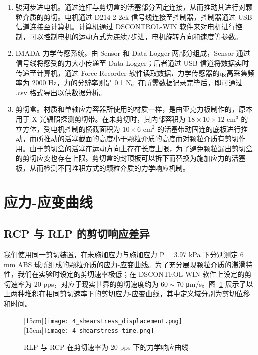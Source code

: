 \begin{enumerate}
    \item 骏河步进电机。通过连杆与剪切盒的活塞部分固定连接，从而推动其进行对颗粒介质的剪切。电机通过 D214-2-2ek 信号线连接至控制器，控制器通过 USB 信道连接至计算机。计算机通过 DSCONTROL-WIN 软件来对电机进行控制，可以控制电机的运动方式为连续/步进，电机旋转方向和速度等参数。
    \item IMADA 力学传感系统。由 Sensor 和 Data Logger 两部分组成，Sensor 通过信号线将感受的力大小传递至 Data Logger；后者通过 USB 信道将数据实时传递至计算机，通过 Force Recorder 软件读取数据，力学传感器的最高采集频率为 2000 \unit{\hertz}，力的分辨率则是 0.1 \unit{\newton}。在所需数据记录完毕后，即可通过 .csv 格式导出以供数据分析。
    \item 剪切盒。材质和单轴应力容器所使用的材质一样，是由亚克力板制作的，原本用于 X 光辐照探测剪切带。在未剪切时，其内部容积为 $18\times 10\times 12$ $\unit{\centi\meter}^{3}$ 的立方体，受电机控制的横截面积为 $10\times 6$ $\unit{\centi\meter}^{2}$ 的活塞带动固连的底板进行推动，而所推动的活塞截面的高度小于颗粒介质的高度而对颗粒介质有剪切作用。由于剪切盒的活塞在运动方向上存在长度上限，为了避免颗粒漏出剪切盒的剪切应变也存在上限。剪切盒的封顶板可以拆下而替换为施加应力的活塞板，从而检测不同堆积方式的颗粒介质的力学响应机制。
\end{enumerate}

\section{应力-应变曲线}

\subsection{RCP 与 RLP 的剪切响应差异}

我们使用同一剪切装置，在未施加应力与施加应力 P = 3.97 \unit{\kilo\pascal} 下分别测定 6 \unit{\milli\meter} ABS 球所组成的颗粒介质的应力-应变曲线。为了充分展现颗粒介质的滞滑特性，我们在实验时设定的剪切速率极低；在 DSCONTROL-WIN 软件上设定的剪切速率为 20 \unit{pps}，对应于现实世界的剪切速度约为 $60\sim 70$ \unit{\micro\meter}/\unit{\second}。图~\ref{fig:shearstress} 展示了以上两种堆积在相同剪切速率下的剪切应力-应变曲线，其中定义域分别为剪切位移和时间。

\begin{figure}[htbp]
	\centering
                  [15cm]{\texttt{[image: 4\_shearstress\_displacement.png]}}\\
                  [15cm]{\texttt{[image: 4\_shearstress\_time.png]}}
  \caption{RLP 与 RCP 在剪切速率为 20 pps 下的力学响应曲线}%
  \label{fig:shearstress}
\end{figure}


